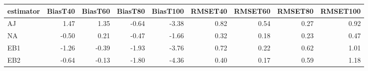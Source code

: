 \begin{table}[ht]
\centering
\begin{tabular}{lrrrrrrrr}
  \toprule
estimator & BiasT40 & BiasT60 & BiasT80 & BiasT100 & RMSET40 & RMSET60 & RMSET80 & RMSET100 \\ 
  \midrule
AJ & 1.47 & 1.35 & -0.64 & -3.38 & 0.82 & 0.54 & 0.27 & 0.92 \\ 
  NA & -0.50 & 0.21 & -0.47 & -1.66 & 0.32 & 0.18 & 0.23 & 0.47 \\ 
  EB1 & -1.26 & -0.39 & -1.93 & -3.76 & 0.72 & 0.22 & 0.62 & 1.01 \\ 
  EB2 & -0.64 & -0.13 & -1.80 & -4.36 & 0.40 & 0.17 & 0.59 & 1.18 \\ 
   \bottomrule
\end{tabular}
\end{table}
